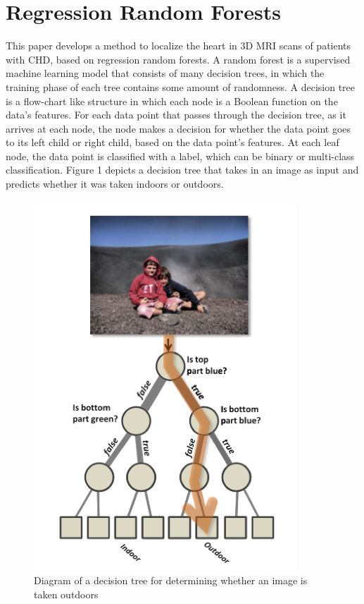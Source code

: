 \section{Regression Random Forests}
This paper develops a method to localize the heart in 3D MRI scans of patients with CHD, based on regression random forests. A random forest is a supervised machine learning model that consists of many decision trees, in which the training phase of each tree contains some amount of randomness. A decision tree is a flow-chart like structure in which each node is a Boolean function on the data's features. For each data point that passes through the decision tree, as it arrives at each node, the node makes a decision for whether the data point goes to its left child or right child, based on the data point's features. At each leaf node, the data point is classified with a label, which can be binary or multi-class classification. Figure 1 depicts a decision tree that takes in an image as input and predicts whether it was taken indoors or outdoors.

\begin{figure}
\includegraphics[scale=0.5]{decisiontree.png}
\caption{Diagram of a decision tree for determining whether an image is taken outdoors}
\end{figure}

